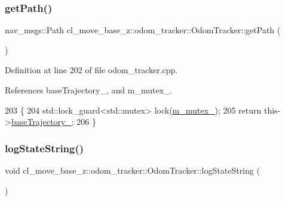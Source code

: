 \mbox{\label{classcl__move__base__z_1_1odom__tracker_1_1OdomTracker_a762bc88653ebb7d78e693ba465fb160f}} 
\subsubsection{\texorpdfstring{get\+Path()}{getPath()}}
{\footnotesize\ttfamily nav\+\_\+msgs\+::\+Path cl\+\_\+move\+\_\+base\+\_\+z\+::odom\+\_\+tracker\+::\+Odom\+Tracker\+::get\+Path (\begin{DoxyParamCaption}{ }\end{DoxyParamCaption})}



Definition at line 202 of file odom\+\_\+tracker.\+cpp.



References base\+Trajectory\+\_\+, and m\+\_\+mutex\+\_\+.


\begin{DoxyCode}
203         \{
204             std::lock\_guard<std::mutex> lock(\hyperlink{classcl__move__base__z_1_1odom__tracker_1_1OdomTracker_aa371639e1eee269273dec8d3ab9dba0f}{m\_mutex\_});
205             \textcolor{keywordflow}{return} this->\hyperlink{classcl__move__base__z_1_1odom__tracker_1_1OdomTracker_a466d18a86df049f0f680e043bb5ea91f}{baseTrajectory\_};
206         \}
\end{DoxyCode}
\mbox{\label{classcl__move__base__z_1_1odom__tracker_1_1OdomTracker_a6d0b450474d9d555205ff4281965164e}} 
\subsubsection{\texorpdfstring{log\+State\+String()}{logStateString()}}
{\footnotesize\ttfamily void cl\+\_\+move\+\_\+base\+\_\+z\+::odom\+\_\+tracker\+::\+Odom\+Tracker\+::log\+State\+String (\begin{DoxyParamCaption}{ }\end{DoxyParamCaption})}



